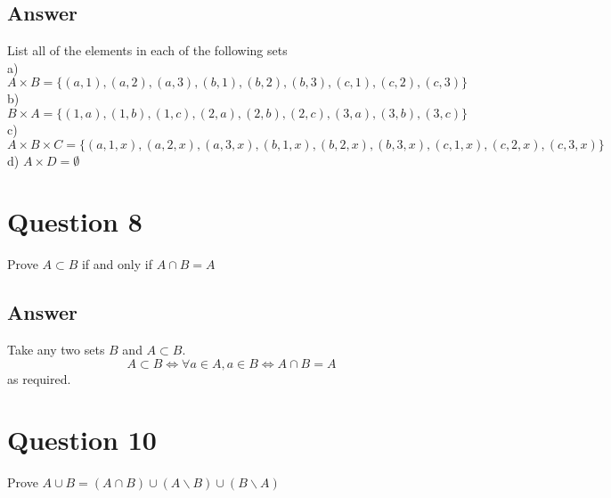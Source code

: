 \documentclass[
	12pt, %
]{fphw}
\newcommand\set[1]{\{#1\}}
\newcommand\qed{\text{$\blacksquare$}}
\begin{document}

\subsection*{Answer} List all of the elements in each of the following sets\\
a) $A \times B = \set{(a,1),(a,2),(a,3),(b,1),(b,2),(b,3),(c,1),(c,2),(c,3)}$\\
b) $B \times A = \set{(1,a),(1,b),(1,c),(2,a),(2,b),(2,c),(3,a),(3,b),(3,c)}$\\
c) $A \times B \times C=\set{(a,1,x),(a,2,x),(a,3,x),(b,1,x),(b,2,x),(b,3,x),(c,1,x),(c,2,x),(c,3,x)}$\\
d) $A \times D = \emptyset$



\section*{Question 8}

\begin{problem}
Prove $A \subset B$ if and only if $A \cap B = A$
\end{problem}


\subsection*{Answer} Take any two sets $B$ and $A \subset B$.
$$
A \subset B  \Longleftrightarrow \forall a \in A, a \in B \Longleftrightarrow A \cap B = A
$$
as required. \qed


\newpage


\section*{Question 10}

\begin{problem}
Prove $A \cup B = (A \cap B) \cup (A \backslash B) \cup (B \backslash A)$
\end{problem}
\end{document}
